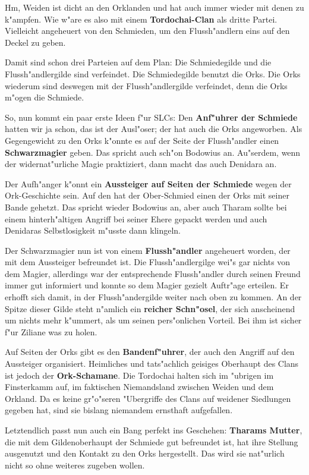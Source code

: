 Hm, Weiden ist dicht an den Orklanden und hat auch immer wieder mit denen zu k"ampfen. Wie w"are es also mit einem \textbf{Tordochai-Clan} als dritte Partei. Vielleicht angeheuert von den Schmieden, um den Flussh"andlern eins auf den Deckel zu geben.

Damit sind schon drei Parteien auf dem Plan: Die Schmiedegilde und die Flussh"andlergilde sind verfeindet. Die Schmiedegilde benutzt die Orks. Die Orks wiederum sind deswegen mit der Flussh"andlergilde verfeindet, denn die Orks m"ogen die Schmiede.

So, nun kommt ein paar erste Ideen f"ur SLCs: Den \textbf{Anf"uhrer der Schmiede} hatten wir ja schon, das ist der Ausl"oser; der hat auch die Orks angeworben. Als Gegengewicht zu den Orks k"onnte es auf der Seite der Flussh"andler einen \textbf{Schwarzmagier} geben. Das spricht auch sch"on Bodowius an. Au"serdem, wenn der widernat"urliche Magie praktiziert, dann macht das auch Denidara an.

Der Aufh"anger k"onnt ein \textbf{Aussteiger auf Seiten der Schmiede} wegen der Ork-Geschichte sein. Auf den hat der Ober-Schmied einen der Orks mit seiner Bande gehetzt. Das spricht wieder Bodowius an, aber auch Tharam sollte bei einem hinterh"altigen Angriff bei seiner Ehere gepackt werden und auch Denidaras Selbstlosigkeit m"usste dann klingeln.

Der Schwarzmagier nun ist von einem \textbf{Flussh"andler} angeheuert worden, der mit dem Aussteiger befreundet ist. Die Flussh"andlergilge wei"s gar nichts von dem Magier, allerdings war der entsprechende Flussh"andler durch seinen Freund immer gut informiert und konnte so dem Magier gezielt Auftr"age erteilen. Er erhofft sich damit, in der Flussh"andergilde weiter nach oben zu kommen. An der Spitze dieser Gilde steht n"amlich ein \textbf{reicher Schn"osel}, der sich anscheinend um nichts mehr k"ummert, als um seinen pers"onlichen Vorteil. Bei ihm ist sicher f"ur Ziliane was zu holen.

Auf Seiten der Orks gibt es den \textbf{Bandenf"uhrer}, der auch den Angriff auf den Aussteiger organisiert. Heimliches und tats"achlich geisiges Oberhaupt des Clans ist jedoch der \textbf{Ork-Schamane}. Die Tordochai halten sich im "ubrigen im Finsterkamm auf, im faktischen Niemandsland zwischen Weiden und dem Orkland. Da es keine gr"o"seren "Ubergriffe des Clans auf weidener Siedlungen gegeben hat, sind sie bislang niemandem ernsthaft aufgefallen.

Letztendlich passt nun auch ein Bang perfekt ins Geschehen: \textbf{Tharams Mutter}, die mit dem Gildenoberhaupt der Schmiede gut befreundet ist, hat ihre Stellung ausgenutzt und den Kontakt zu den Orks hergestellt. Das wird sie nat"urlich nicht so ohne weiteres zugeben wollen.

